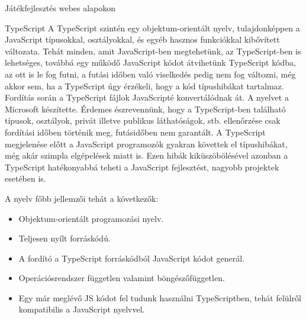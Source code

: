 \begin{MyChapter}{Játékfejlesztés webes alapokon}
	\begin{MySection}{TypeScript}
		A TypeScript szintén egy objektum-orientált nyelv, tulajdonképpen a JavaScript típusokkal, osztályokkal, és egyéb hasznos funkciókkal kibővített változata. Tehát minden, amit JavaScript-ben megtehetünk, az TypeScript-ben is lehetséges, továbbá egy működő JavaScript kódot átvihetünk TypeScript kódba, az ott is le fog futni, a futási időben való viselkedés pedig nem fog változni, még akkor sem, ha a TypeScript úgy érzékeli, hogy a kód típushibákat tartalmaz. Fordítás során a TypeScript fájlok JavaScripté konvertálódnak át. A nyelvet a Microsoft készítette. Érdemes észrevennünk, hogy a TypeScript-ben található típusok, osztályok, privát illetve publikus láthatóságok, stb. ellenőrzése csak fordítási időben történik meg, futásidőben nem garantált.
		A TypeScript megjelenése előtt a JavaScript programozók gyakran követtek el típushibákat, még akár szimpla elgépelések miatt is. Ezen hibák kiküszöbölésével azonban a TypeScript hatékonyabbá teheti a JavaScript fejlesztést, nagyobb projektek esetében is.
		
		A nyelv főbb jellemzői tehát a következők:
		\begin{itemize}
			\item Objektum-orientált programozási nyelv.
			\item Teljesen nyílt forráskódú.
			\item A fordító a TypeScript forráskódból JavaScript kódot generál.
			\item Operációsrendszer független valamint böngészőfüggetlen.
			\item Egy már meglévő JS kódot fel tudunk használni TypeScriptben, tehát felülről kompatibilis a JavaScript nyelvvel.
		\end{itemize}
	\end{MySection}


\end{MyChapter}
